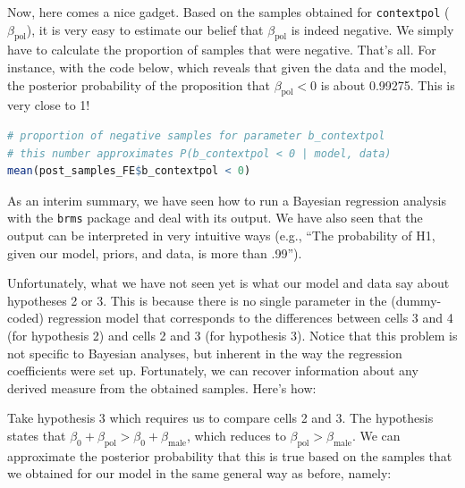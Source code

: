 \documentclass[nobib]{tufte-handout}
\begin{document}
Now, here comes a nice gadget. Based on the samples obtained for \texttt{contextpol} ($\beta_{\text{pol}}$), it is very easy to estimate our belief that $\beta_{\text{pol}}$ is indeed negative. We simply have to calculate the proportion of samples that were negative. That's all. For instance, with the code below, which reveals that given the data and the model, the posterior probability of the proposition that $\beta_{\text{pol}} < 0$ is about 0.99275. This is very close to 1!  

\bigskip

\begin{minipage}[]{\textwidth}
\begin{lstlisting}[language=R]
# proportion of negative samples for parameter b_contextpol
# this number approximates P(b_contextpol < 0 | model, data)
mean(post_samples_FE$b_contextpol < 0)
\end{lstlisting}
\end{minipage}

As an interim summary, we have seen how to run a Bayesian regression analysis with the \texttt{brms} package and deal with its output. We have also seen that the output can be interpreted in very intuitive ways (e.g., ``The probability of H1, given our model, priors, and data, is more than .99'').

Unfortunately, what we have not seen yet is what our model and data say about hypotheses 2 or 3. This is because there is no single parameter in the (dummy-coded) regression model that corresponds to the differences between cells 3 and 4 (for hypothesis 2) and cells 2 and 3 (for hypothesis 3). Notice that this problem is not specific to Bayesian analyses, but inherent in the way the regression coefficients were set up.
%
%
Fortunately, we can recover information about any derived measure from the obtained samples. Here's how:

Take hypothesis 3 which requires us to compare cells 2 and 3. The hypothesis states that
$\beta_0 + \beta_{\text{pol}} > \beta_0 + \beta_{\text{male}}$, which reduces to
$\beta_{\text{pol}} > \beta_{\text{male}}$. We can approximate the posterior probability that
this is true based on the samples that we obtained for our model in the same general way as
before, namely:
\end{document}
